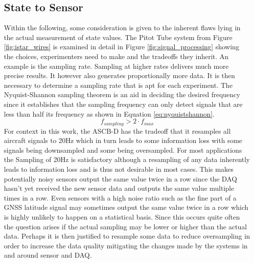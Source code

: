 \subsection{State to Sensor}
Within the following, some consideration is given to the inherent flaws lying in the actual measurement of state values. The Pitot Tube system from Figure \ref{fig:istar_wires} is examined in detail in Figure \ref{fig:signal_processing} showing the choices, experimenters need to make and the tradeoffs they inherit. An example is the sampling rate. Sampling at higher rates delivers much more precise results. It however also generates proportionally more data. It is then necessary to determine a sampling rate that is apt for each experiment. The Nyquist-Shannon sampling theorem is an aid in deciding the desired frequency since it establishes that the sampling frequency can only detect signals that are less than half its frequency as shown in Equation \ref{eq:nyquistshannon}. \cite{smith_scientist_1999}
\begin{equation}
    f_{sampling} > 2 \cdot f_{max}
    \label{eq:nyquistshannon}
\end{equation}
For context in this work, the ASCB-D has the tradeoff that it resamples all aircraft signals to 20Hz which in turn leads to some information loss with some signals being downsampled and some being oversampled. For most applications the Sampling of 20Hz is satisfactory although a resampling of any data inherently leads to information loss and is thus not desirable in most cases. This makes potentially noisy sensors output the same value twice in a row since the DAQ hasn't yet received the new sensor data and outputs the same value multiple times in a row. Even sensors with a high noise ratio such as the fine part of a GNSS latitude signal may sometimes output the same value twice in a row which is highly unlikely to happen on a statistical basis. Since this occurs quite often the question arises if the actual sampling may be lower or higher than the actual data. Perhaps it is then justified to resample some data to reduce oversampling in order to increase the data quality mitigating the changes made by the systems in and around sensor and DAQ.

